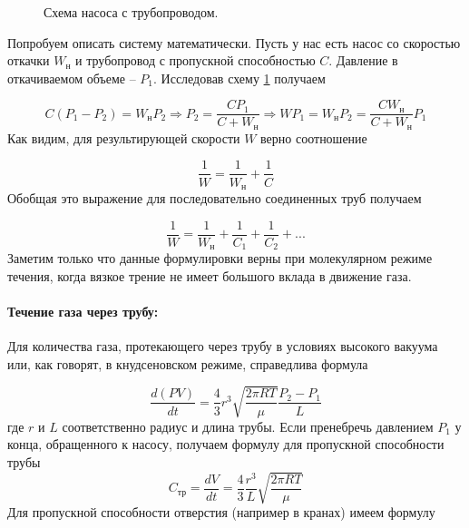 \documentclass[a4paper, 12pt]{article}
\begin{document}
    \begin{figure}[h]
        \caption{Схема насоса с трубопроводом.}
        \label{ris:nasos_sketch}
    \end{figure}
    Попробуем описать систему математически. Пусть у нас есть насос со скоростью откачки $W_н$ и трубопровод с пропускной способностью $C$. Давление в откачиваемом объеме -- $P_1$. Исследовав схему \ref{ris:nasos_sketch} получаем

    \begin{equation*}
        C(P_1 - P_2)=W_нP_2 \Rightarrow P_2=\frac{CP_1}{C+W_н} \Rightarrow WP_1=W_нP_2=\frac{CW_н}{C+W_н}P_1
    \end{equation*}
    Как видим, для результирующей скорости $W$ верно соотношение

    \begin{equation*}
        \frac{1}{W} = \frac{1}{W_н} + \frac{1}{C}
    \end{equation*}
    Обобщая это выражение для последовательно соединенных труб получаем

    \begin{equation}
        \frac{1}{W} = \frac{1}{W_н} + \frac{1}{C_1} + \frac{1}{C_2} + ...
        \label{resulting_speed}
    \end{equation}
    Заметим только что данные формулировки верны при молекулярном режиме течения, когда вязкое трение не имеет большого вклада в движение газа.

    \paragraph{Течение газа через трубу:} Для количества газа, протекающего через трубу в условиях высокого вакуума или, как говорят, в кнудсеновском режиме, справедлива формула

    \begin{equation}
        \frac{d(PV)}{dt} = \frac{4}{3}r^3 \sqrt{\frac{2\pi RT}{\mu}} \frac{P_2 - P_1}{L}
        \label{prop_spos_truba}
    \end{equation}
    где $r$ и $L$ соответственно радиус и длина трубы. Если пренебречь давлением $P_1$ у конца, обращенного к насосу, получаем формулу для пропускной способности трубы
    \begin{equation}
    C_{тр} = \frac{dV}{dt} = \frac{4}{3}\frac{r^3}{L}\sqrt{\frac{2\pi RT}{\mu}} \label{C_trubki}
    \end{equation}
    Для пропускной способности отверстия (например в кранах) имеем формулу
\end{document}
